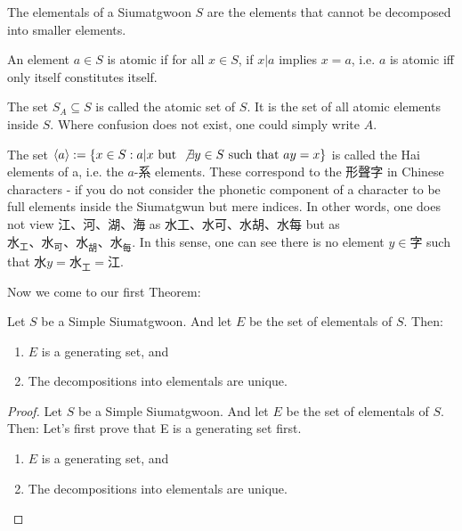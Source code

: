 \begin{definition}[Elementals]\label{def:elementals}
    The elementals of a Siumatgwoon $S$ are the elements that cannot be decomposed into smaller elements.
\end{definition}


\begin{definition}\label{def:atomic-element}
An element $a \in S$ is atomic if for all $x\in S$, if $x|a$ implies $x=a$, i.e. $a$ is atomic iff only itself constitutes itself.
\end{definition}

\begin{definition}\label{def:atomic-set}
The set $S_A \subseteq S$ is called the atomic set of $S$. It is the set of all atomic elements inside $S$. Where confusion does not exist, one could simply write $A$.
\end{definition}

\begin{definition}\label{def:hai-elements}
The set $\langle a \rangle := \{ x\in S: a|x \text{ but } \not \exists y \in S \text{ such that } ay=x\}$ is called the Hai elements of a, i.e. the $a$-系 elements. These correspond to the 形聲字 in Chinese characters - if you do not consider the phonetic component of a character to be full elements inside the Siumatgwun but mere indices. In other words, one does not view 江、河、湖、海 as 水工、水可、水胡、水每 but as $水_工、水_可、水_胡、水_每$. In this sense, one can see there is no element $y \in 字$ such that $水y=水_工=江$.
\end{definition}


Now we come to our first Theorem: 
\begin{theorem}
    Let $S$ be a Simple Siumatgwoon. And let $E$ be the set of elementals of $S$. Then: 
    \begin{enumerate}
        \item $E$ is a generating set, and 
        \item The decompositions into elementals are unique.
    \end{enumerate}
\end{theorem}
\begin{proof}
    Let $S$ be a Simple Siumatgwoon. And let $E$ be the set of elementals of $S$. Then: 
    Let's first prove that E is a generating set first.
    \begin{enumerate}
        \item $E$ is a generating set, and 
        \item The decompositions into elementals are unique.
    \end{enumerate}
\end{proof}


